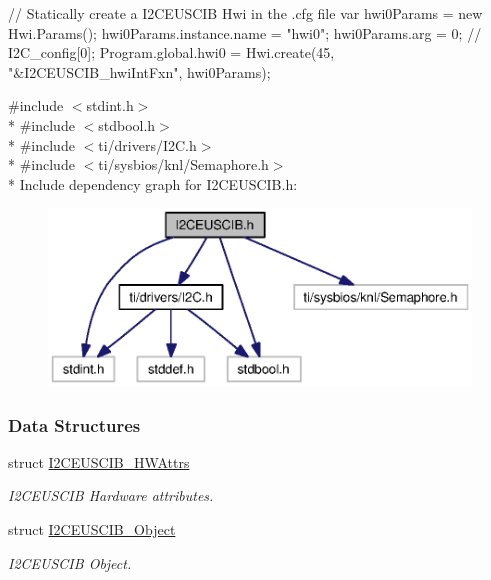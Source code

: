 \begin{DoxyCode}
\textcolor{comment}{// Statically create a I2CEUSCIB Hwi in the .cfg file}
var hwi0Params = \textcolor{keyword}{new} Hwi.Params();
hwi0Params.instance.name = \textcolor{stringliteral}{"hwi0"};
hwi0Params.arg = 0;  \textcolor{comment}{// I2C\_config[0];}
Program.global.hwi0 = Hwi.create(45, \textcolor{stringliteral}{"&I2CEUSCIB\_hwiIntFxn"}, hwi0Params);
\end{DoxyCode}
 

{\ttfamily \#include $<$stdint.\+h$>$}\\*
{\ttfamily \#include $<$stdbool.\+h$>$}\\*
{\ttfamily \#include $<$ti/drivers/\+I2\+C.\+h$>$}\\*
{\ttfamily \#include $<$ti/sysbios/knl/\+Semaphore.\+h$>$}\\*
Include dependency graph for I2\+C\+E\+U\+S\+C\+I\+B.\+h\+:
\nopagebreak
\begin{figure}[H]
\begin{center}
\leavevmode
\includegraphics[width=350pt]{_i2_c_e_u_s_c_i_b_8h__incl}
\end{center}
\end{figure}
\subsubsection*{Data Structures}
\begin{DoxyCompactItemize}
\item 
struct \hyperlink{struct_i2_c_e_u_s_c_i_b___h_w_attrs}{I2\+C\+E\+U\+S\+C\+I\+B\+\_\+\+H\+W\+Attrs}
\begin{DoxyCompactList}\small\item\em I2\+C\+E\+U\+S\+C\+I\+B Hardware attributes. \end{DoxyCompactList}\item 
struct \hyperlink{struct_i2_c_e_u_s_c_i_b___object}{I2\+C\+E\+U\+S\+C\+I\+B\+\_\+\+Object}
\begin{DoxyCompactList}\small\item\em I2\+C\+E\+U\+S\+C\+I\+B Object. \end{DoxyCompactList}\end{DoxyCompactItemize}
